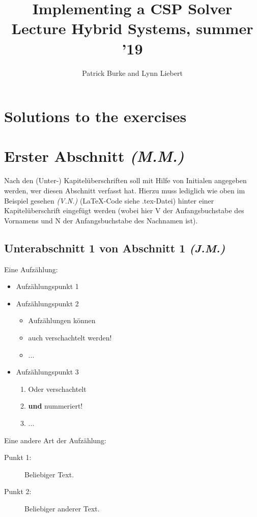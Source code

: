 \documentclass{article}
\title{Implementing a CSP Solver\\\small{Lecture Hybrid Systems, summer '19}}
\author{Patrick Burke and Lynn Liebert}
\newcommand{\initials}[1]{\small{\textit{(#1)}} \normalsize}
\begin{document}
\maketitle %

\listoftodos

\begin{abstract}
\end{abstract}

\tableofcontents
\newpage


\newpage


\section{Solutions to the exercises}







\section{Erster Abschnitt \initials{M.M.}}
Nach den (Unter-) Kapitelüberschriften soll mit Hilfe von Initialen angegeben werden, wer diesen Abschnitt verfasst hat. Hierzu muss lediglich wie oben im Beispiel gesehen \initials{V.N.} (LaTeX-Code siehe .tex-Datei) hinter einer Kapitelüberschrift eingefügt werden (wobei hier V der Anfangsbuchstabe des Vornamens und N der Anfangsbuchstabe des Nachnamen ist). 
\subsection{Unterabschnitt 1 von Abschnitt 1 \initials{J.M.}}
Eine Aufzählung:
\begin{itemize}
    \item Aufzählungspunkt 1
    \item Aufzählungspunkt 2
	\begin{itemize}
	    \item Aufzählungen können 
	    \item auch verschachtelt werden!
	    \item ...
	\end{itemize}    
    \item Aufzählungspunkt 3
	\begin{enumerate}
	    \item Oder verschachtelt
	    \item \textbf{und} nummeriert!
	    \item ...
	\end{enumerate}
\end{itemize}
Eine andere Art der Aufzählung:
\begin{description}
    \item[Punkt 1: ] Beliebiger Text.
    \item[Punkt 2: ] Beliebiger anderer Text.
\end{description}
\end{document}
